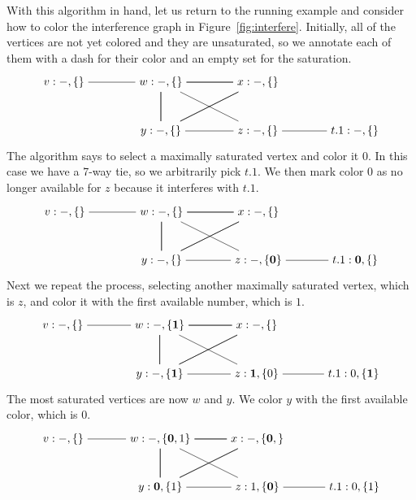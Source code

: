 \documentclass[11pt]{book}
\begin{document}
With this algorithm in hand, let us return to the running example and
consider how to color the interference graph in
Figure~\ref{fig:interfere}. Initially, all of the vertices are not yet
colored and they are unsaturated, so we annotate each of them with a
dash for their color and an empty set for the saturation.
\[
\begin{tikzpicture}[baseline=(current  bounding  box.center)]
\node (v) at (0,0)    {$v:-,\{\}$};
\node (w) at (3,0)    {$w:-,\{\}$};
\node (x) at (6,0)    {$x:-,\{\}$};
\node (y) at (3,-1.5) {$y:-,\{\}$};
\node (z) at (6,-1.5) {$z:-,\{\}$};
\node (t1) at (9,-1.5)   {$t.1:-,\{\}$};

\draw (v) to (w);
\foreach \i in {w,x,y}
{
  \foreach \j in {w,x,y}
  {
    \draw (\i) to (\j);
  }
}
\draw (z) to (w);
\draw (z) to (y);
\draw (t1) to (z);
\end{tikzpicture}
\]
The algorithm says to select a maximally saturated vertex and color it
$0$. In this case we have a 7-way tie, so we arbitrarily pick
$t.1$. We then mark color $0$ as no longer available for $z$ because
it interferes with $t.1$.
\[
\begin{tikzpicture}[baseline=(current  bounding  box.center)]
\node (v) at (0,0)    {$v:-,\{\}$};
\node (w) at (3,0)    {$w:-,\{\}$};
\node (x) at (6,0)    {$x:-,\{\}$};
\node (y) at (3,-1.5) {$y:-,\{\}$};
\node (z) at (6,-1.5) {$z:-,\{\mathbf{0}\}$};
\node (t1) at (9,-1.5)   {$t.1:\mathbf{0},\{\}$};
\draw (v) to (w);
\foreach \i in {w,x,y}
{
  \foreach \j in {w,x,y}
  {
    \draw (\i) to (\j);
  }
}
\draw (z) to (w);
\draw (z) to (y);
\draw (t1) to (z);
\end{tikzpicture}
\]
Next we repeat the process, selecting another maximally saturated
vertex, which is $z$, and color it with the first available number,
which is $1$.
\[
\begin{tikzpicture}[baseline=(current  bounding  box.center)]
\node (v) at (0,0)    {$v:-,\{\}$};
\node (w) at (3,0)    {$w:-,\{\mathbf{1}\}$};
\node (x) at (6,0)    {$x:-,\{\}$};
\node (y) at (3,-1.5) {$y:-,\{\mathbf{1}\}$};
\node (z) at (6,-1.5) {$z:\mathbf{1},\{0\}$};
\node (t1) at (9,-1.5)   {$t.1:0,\{\mathbf{1}\}$};
\draw (t1) to (z);
\draw (v) to (w);
\foreach \i in {w,x,y}
{
  \foreach \j in {w,x,y}
  {
    \draw (\i) to (\j);
  }
}
\draw (z) to (w);
\draw (z) to (y);
\end{tikzpicture}
\]
The most saturated vertices are now $w$ and $y$. We color $y$ with the
first available color, which is $0$.
\[
\begin{tikzpicture}[baseline=(current  bounding  box.center)]
\node (v) at (0,0)    {$v:-,\{\}$};
\node (w) at (3,0)    {$w:-,\{\mathbf{0},1\}$};
\node (x) at (6,0)    {$x:-,\{\mathbf{0},\}$};
\node (y) at (3,-1.5) {$y:\mathbf{0},\{1\}$};
\node (z) at (6,-1.5) {$z:1,\{\mathbf{0}\}$};
\node (t1) at (9,-1.5)   {$t.1:0,\{1\}$};
\draw (t1) to (z);
\draw (v) to (w);
\foreach \i in {w,x,y}
{
  \foreach \j in {w,x,y}
  {
    \draw (\i) to (\j);
  }
}
\draw (z) to (w);
\draw (z) to (y);
\end{tikzpicture}
\]
\end{document}
